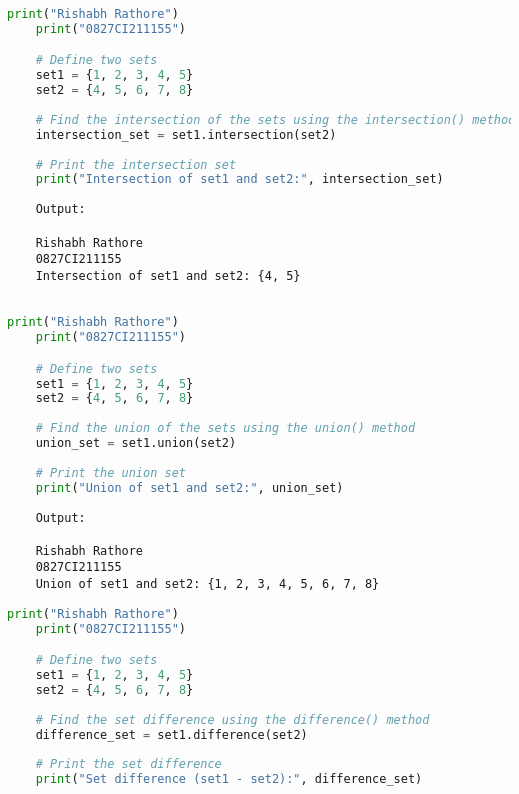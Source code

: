 \documentclass{report}
\begin{document}
\newpage


\sol 
\begin{lstlisting}[language=Python]
	print("Rishabh Rathore")
	print("0827CI211155")

	# Define two sets
	set1 = {1, 2, 3, 4, 5}
	set2 = {4, 5, 6, 7, 8}
	
	# Find the intersection of the sets using the intersection() method
	intersection_set = set1.intersection(set2)
	
	# Print the intersection set
	print("Intersection of set1 and set2:", intersection_set)
\end{lstlisting}

\begin{verbatim}
	Output:

	Rishabh Rathore
	0827CI211155
	Intersection of set1 and set2: {4, 5}
	
\end{verbatim}


\newpage


\sol 
\begin{lstlisting}[language=Python]
	print("Rishabh Rathore")
	print("0827CI211155")

	# Define two sets
	set1 = {1, 2, 3, 4, 5}
	set2 = {4, 5, 6, 7, 8}
	
	# Find the union of the sets using the union() method
	union_set = set1.union(set2)
	
	# Print the union set
	print("Union of set1 and set2:", union_set)
\end{lstlisting}

\begin{verbatim}
	Output:

	Rishabh Rathore
	0827CI211155
	Union of set1 and set2: {1, 2, 3, 4, 5, 6, 7, 8}

\end{verbatim}


\newpage


\sol 
\begin{lstlisting}[language=Python]
	print("Rishabh Rathore")
	print("0827CI211155")

	# Define two sets
	set1 = {1, 2, 3, 4, 5}
	set2 = {4, 5, 6, 7, 8}
	
	# Find the set difference using the difference() method
	difference_set = set1.difference(set2)
	
	# Print the set difference
	print("Set difference (set1 - set2):", difference_set)
\end{lstlisting}
\end{document}
